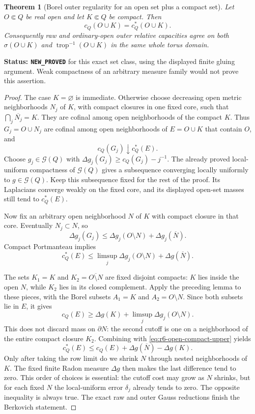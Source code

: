 \documentclass[11pt,a4paper]{article}
\numberwithin{equation}{section}
\newtheorem{theorem}{Theorem}[section]
\theoremstyle{definition}
\theoremstyle{remark}
\begin{document}
\begin{theorem}[Borel outer regularity for an open set plus a compact set]
\label{thm:r6-convex-open-compact-C2}
Let $O\Subset Q$ be real open and let $K\Subset Q$ be compact.
Then
\[
                         c_Q(O\cup K)=c_Q^*(O\cup K).
\]
Consequently raw and ordinary-open outer relative capacities agree
on both $\sigma(O\cup K)$ and
$\operatorname{trop}^{-1}(O\cup K)$ in the same whole torus domain.
\end{theorem}

\noindent\textbf{Status: \texttt{NEW\_PROVED}} for this exact
set class, using the displayed finite gluing argument. Weak compactness
of an arbitrary measure family would not prove this assertion.

\begin{proof}
The case $K=\varnothing$ is immediate. Otherwise choose decreasing
open metric neighborhoods $N_j$ of $K$, with compact closures in
one fixed core, such that $\bigcap_j\overline{N_j}=K$.
They are cofinal among open neighborhoods of the compact $K$.
Thus $G_j=O\cup N_j$ are cofinal among open neighborhoods of
$E=O\cup K$ that contain $O$, and
\[
                         c_Q(G_j)\downarrow c_Q^*(E).
\]
Choose $g_j\in\mathcal G(Q)$ with
$\Delta g_j(G_j)\ge c_Q(G_j)-j^{-1}$.
The already proved local-uniform compactness of $\mathcal G(Q)$
gives a subsequence converging locally uniformly to
$g\in\mathcal G(Q)$. Keep this subsequence fixed for the rest of
the proof. Its Laplacians converge weakly on the fixed core, and
its displayed open-set masses still tend to $c_Q^*(E)$.

Now fix an arbitrary open neighborhood $N$ of $K$ with compact
closure in that core. Eventually $N_j\subset N$, so
\[
 \Delta g_j(G_j)
      \le\Delta g_j(O\setminus N)+\Delta g_j(\overline N).
\]
Compact Portmanteau implies
\begin{equation}
 c_Q^*(E)\le\limsup_j\Delta g_j(O\setminus N)
                                        +\Delta g(\overline N).
 \label{eq:r6-open-compact-upper}
\end{equation}

The sets $K_1=K$ and $K_2=\overline{O\setminus N}$ are fixed
disjoint compacts: $K$ lies inside the open $N$, while $K_2$ lies
in its closed complement. Apply the preceding lemma to these
pieces, with the Borel subsets $A_1=K$ and $A_2=O\setminus N$.
Since both subsets lie in $E$, it gives
\[
 c_Q(E)\ge\Delta g(K)+\limsup_j\Delta g_j(O\setminus N).
\]
This does not discard mass on $\partial N$: the second cutoff is
one on a neighborhood of the entire compact closure $K_2$.
Combining with \eqref{eq:r6-open-compact-upper} yields
\[
                 c_Q^*(E)\le c_Q(E)
                                +\Delta g(\overline N)-\Delta g(K).
\]
Only after taking the row limit do we shrink $N$ through nested
neighborhoods of $K$. The fixed finite Radon measure $\Delta g$
then makes the last difference tend to zero. This order of choices
is essential: the cutoff cost may grow as $N$ shrinks, but for each
fixed $N$ the local-uniform error $\delta_j$ already tends to zero.
The opposite inequality is always true. The exact raw and outer
Gauss reductions finish the Berkovich statement.
\end{proof}
\end{document}
